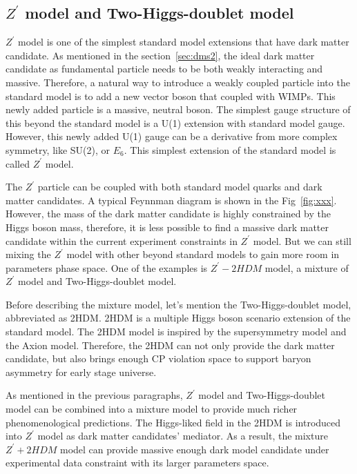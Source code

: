 \subsection{$Z^{\prime}$ model and Two-Higgs-doublet model}
\par $Z^{\prime}$ model\cite{He:1991qd} is one of the simplest standard model extensions that have dark matter candidate. As mentioned in the section~\ref{sec:dms2}, the ideal dark matter candidate as fundamental particle needs to be both weakly interacting and massive. Therefore, a natural way to introduce a weakly coupled particle into the standard model is to add a new vector boson that coupled with WIMPs. This newly added particle is a massive, neutral boson. The simplest gauge structure of this beyond the standard model is a U(1) extension with standard model gauge. However, this newly added U(1) gauge can be a derivative from more complex symmetry, like SU(2), or $E_{6}$. This simplest extension of the standard model is called $Z^{\prime}$ model.

\par The $Z^\prime$ particle can be coupled with both standard model quarks and dark matter candidates. A typical Feynnman diagram is shown in the Fig~\ref{fig:xxx}. However, the mass of the dark matter candidate is highly constrained by the Higgs boson mass, therefore, it is less possible to find a massive dark matter candidate within the current experiment constraints in $Z^{\prime}$ model. But we can still mixing the $Z^{\prime}$ model with other beyond standard models to gain more room in parameters phase space. One of the examples is $Z^{\prime}-2HDM$ model, a mixture of $Z^{\prime}$ model and Two-Higgs-doublet model.

\par Before describing the mixture model, let’s mention the Two-Higgs-doublet model\cite{Branco:2011iw}, abbreviated as 2HDM. 2HDM is a multiple Higgs boson scenario extension of the standard model. The 2HDM model is inspired by the supersymmetry model\cite{Martin:1997ns} and the Axion model\cite{Peccei:2006as}. Therefore, the 2HDM can not only provide the dark matter candidate, but also brings enough CP violation space to support baryon asymmetry for early stage universe.


\par As mentioned in the previous paragraphs, $Z^{\prime}$ model and Two-Higgs-doublet model can be combined into a mixture model to provide much richer phenomenological predictions. The Higgs-liked field in the 2HDM is introduced into $Z^{\prime}$ model as dark matter candidates’ mediator. As a result, the mixture $Z^{\prime}+2HDM$ model\cite{Berlin:2014cfa} can provide massive enough dark model candidate under experimental data constraint with its larger parameters space.


